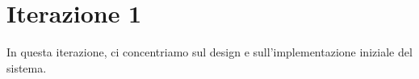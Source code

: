 \documentclass{softwaredoc}
\begin{document}
\newpage
\section*{Iterazione 1}
In questa iterazione, ci concentriamo sul design e sull'implementazione iniziale del sistema.


\newpage

\newpage

\end{document}
